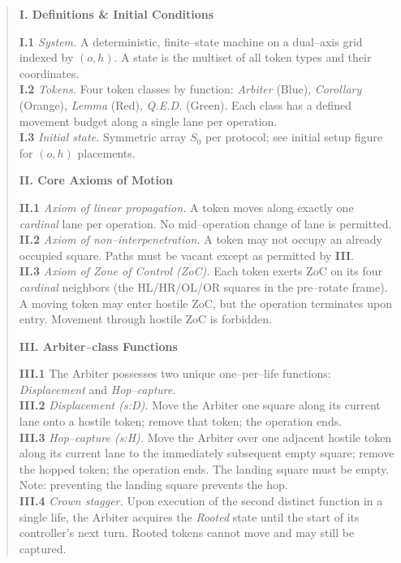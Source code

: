 \documentclass[11pt]{article}
\begin{document}
\begin{quote}\small
\textbf{I. Definitions \& Initial Conditions}

\textbf{I.1} \textit{System.} A deterministic, finite--state machine on a dual--axis grid indexed by $(o,h)$. A state is the multiset of all token types and their coordinates.\\
\textbf{I.2} \textit{Tokens.} Four token classes by function: \emph{Arbiter} (Blue), \emph{Corollary} (Orange), \emph{Lemma} (Red), \emph{Q.E.D.} (Green). Each class has a defined movement budget along a single lane per operation.\\
\textbf{I.3} \textit{Initial state.} Symmetric array $S_0$ per protocol; see initial setup figure for $(o,h)$ placements.

\medskip
\textbf{II. Core Axioms of Motion}

\textbf{II.1} \textit{Axiom of linear propagation.} A token moves along exactly one \emph{cardinal} lane per operation. No mid--operation change of lane is permitted.\\
\textbf{II.2} \textit{Axiom of non--interpenetration.} A token may not occupy an already occupied square. Paths must be vacant except as permitted by \textbf{III}.\\
\textbf{II.3} \textit{Axiom of Zone of Control (ZoC).} Each token exerts ZoC on its four \emph{cardinal} neighbors (the HL/HR/OL/OR squares in the pre--rotate frame). A moving token may enter hostile ZoC, but the operation terminates upon entry. Movement through hostile ZoC is forbidden.

\medskip
\textbf{III. Arbiter--class Functions}

\textbf{III.1} The Arbiter possesses two unique one--per--life functions: \emph{Displacement} and \emph{Hop--capture}.\\
\textbf{III.2} \textit{Displacement (s:D).} Move the Arbiter one square along its current lane onto a hostile token; remove that token; the operation ends.\\
\textbf{III.3} \textit{Hop--capture (s:H).} Move the Arbiter over one adjacent hostile token along its current lane to the immediately subsequent empty square; remove the hopped token; the operation ends. The landing square must be empty. Note: preventing the landing square prevents the hop.\\
\textbf{III.4} \textit{Crown stagger.} Upon execution of the second distinct function in a single life, the Arbiter acquires the \emph{Rooted} state until the start of its controller's next turn. Rooted tokens cannot move and may still be captured.


\end{quote}
\end{document}
